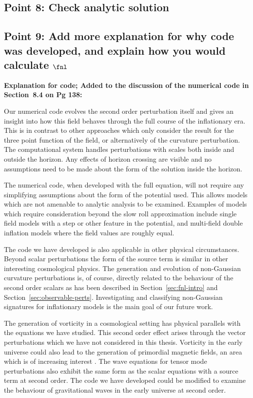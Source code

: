 \subsection{Point 8: Check analytic solution}

\subsection{Point 9: Add more explanation for why code was developed, and explain how
you would calculate \texorpdfstring{$\fnl$}{fNL}}

\textbf{Explanation for code; Added to the discussion of the numerical code in Section~8.4 on Pg
138:}

Our numerical code evolves the second order perturbation itself and gives an insight into how this
field behaves through the full course of the inflationary era. This is in contrast to other
approaches which only consider the result for the three point function of the field, or
alternatively of the curvature perturbation.
% 
The computational system handles perturbations with scales both inside and outside the horizon. Any
effects of horizon crossing are visible and no assumptions need to be made about the form of the
solution inside the horizon.

The numerical code, when developed with the full equation, will not require any simplifying
assumptions about the form of the potential used. This allows models which are not amenable to
analytic analysis to be examined. Examples of models which require consideration beyond the slow
roll approximation include single field models with a step or other feature in the potential, and
multi-field double inflation models where the field values are roughly equal.


The code we have developed is also applicable in other physical circumstances. Beyond scalar
perturbations the form of the source term is similar in other interesting cosmological physics. 
The generation and evolution of non-Gaussian curvature perturbations is, of course, directly related
to the behaviour of the second order scalars as has been described in Section~\ref{sec:fnl-intro}
and Section~\ref{sec:observable-perts}. Investigating and classifying non-Gaussian signatures for
inflationary models is the main goal of our future work.

The generation of vorticity in a cosmological setting has physical parallels with the equations we
have studied. This second order effect arises through the vector perturbations which we have not
considered in this thesis. Vorticity in the early universe could also lead to the generation of
primordial magnetic fields, an area which is of increasing interest
\cite{Christopherson:2009bt,1950ZNatA...5...65B}.
% 
The wave equations for tensor mode perturbations also exhibit the same form as the scalar equations
with a source term at second order. The code we have developed could be modified to examine the
behaviour of gravitational waves in the early universe at second order.

